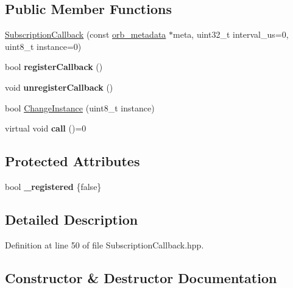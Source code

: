 \subsection*{Public Member Functions}
\begin{DoxyCompactItemize}
\item 
\hyperlink{classuORB_1_1SubscriptionCallback_acc7373f302eb194d01734aedab1db772}{Subscription\+Callback} (const \hyperlink{structorb__metadata}{orb\+\_\+metadata} $\ast$meta, uint32\+\_\+t interval\+\_\+us=0, uint8\+\_\+t instance=0)
\item 
\mbox{\label{classuORB_1_1SubscriptionCallback_a1c8b2b68441e61d7c460efe94617b3c4}} 
bool {\bfseries register\+Callback} ()
\item 
\mbox{\label{classuORB_1_1SubscriptionCallback_a42885c3adf9615ae6516728e295c589b}} 
void {\bfseries unregister\+Callback} ()
\item 
bool \hyperlink{classuORB_1_1SubscriptionCallback_a63a7297780d7d29b47c25117ec3d7532}{Change\+Instance} (uint8\+\_\+t instance)
\item 
\mbox{\label{classuORB_1_1SubscriptionCallback_a66f5f5f9f7217f855f54fbcd48e69c52}} 
virtual void {\bfseries call} ()=0
\end{DoxyCompactItemize}
\subsection*{Protected Attributes}
\begin{DoxyCompactItemize}
\item 
\mbox{\label{classuORB_1_1SubscriptionCallback_ade1bb35d9dfe8bbcce3ff128f52dd964}} 
bool {\bfseries \+\_\+registered} \{false\}
\end{DoxyCompactItemize}


\subsection{Detailed Description}


Definition at line 50 of file Subscription\+Callback.\+hpp.



\subsection{Constructor \& Destructor Documentation}
\mbox{\label{classuORB_1_1SubscriptionCallback_acc7373f302eb194d01734aedab1db772}} 
